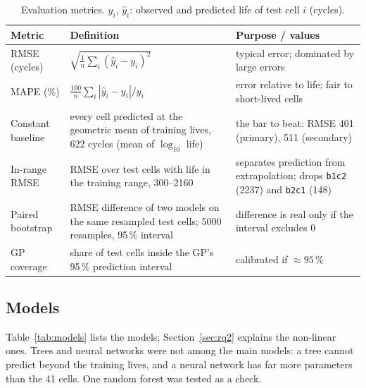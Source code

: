 \begin{table}[!htb]
\centering
\caption{Evaluation metrics. $y_i$, $\hat y_i$: observed and predicted
life of test cell $i$ (cycles).}
\label{tab:metrics}
\small
\setlength{\tabcolsep}{2.5pt}
\begin{tabular}{@{}>{\raggedright\arraybackslash}p{}>{\raggedright\arraybackslash}p{}>{\raggedright\arraybackslash}p{}@{}}
\toprule
Metric & Definition & Purpose / values \\
\midrule
RMSE (cycles) & $\sqrt{\tfrac1n\sum_i(\hat y_i-y_i)^2}$ & typical error; dominated by large errors \\
MAPE (\%) & $\tfrac{100}{n}\sum_i|\hat y_i-y_i|/y_i$ & error relative to life; fair to short-lived cells \\
Constant baseline & every cell predicted at the geometric mean of training lives, 622 cycles (mean of $\log_{10}$ life) & the bar to beat: RMSE 401 (primary), 511 (secondary) \\
In-range RMSE & RMSE over test cells with life in the training range, 300--2160 & separates prediction from extrapolation; drops \texttt{b1c2} (2237) and \texttt{b2c1} (148) \\
Paired bootstrap & RMSE difference of two models on the same resampled test cells; 5000 resamples, 95\,\% interval & difference is real only if the interval excludes 0 \\
GP coverage & share of test cells inside the GP's 95\,\% prediction interval & calibrated if $\approx95$\,\% \\
\bottomrule
\end{tabular}
\end{table}

\subsection{Models}
Table~\ref{tab:models} lists the models; Section~\ref{sec:rq2} explains
the non-linear ones. Trees and neural networks were not among the main
models: a tree cannot predict beyond the training lives, and a neural
network has far more parameters than the 41 cells. One random forest was
tested as a check.

